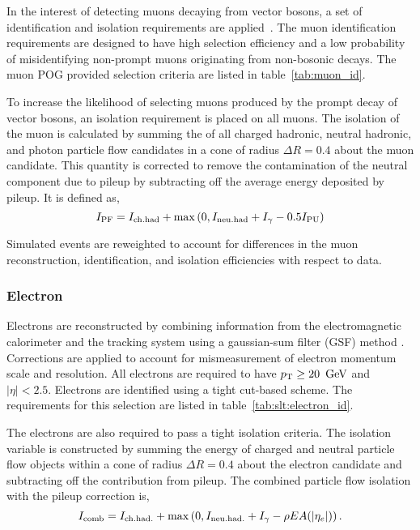 In the interest of detecting muons decaying from vector bosons, a set of identification and isolation requirements are applied~\cite{Sirunyan:2018fpa}. The muon identification requirements are designed to have high selection efficiency and a low probability of misidentifying non-prompt muons originating from non-bosonic decays. The muon POG provided selection criteria are listed in table~\ref{tab:muon_id}.



\noindent To increase the likelihood of selecting muons produced by the prompt decay of vector bosons, an isolation requirement is placed on all muons. The isolation of the muon is calculated by summing the \pt of all charged hadronic, neutral hadronic, and photon particle flow candidates in a cone of radius $\Delta R = 0.4$ about the muon candidate. This quantity is corrected to remove the contamination of the neutral component due to pileup by subtracting off the average energy deposited by pileup. It is defined as,
\begin{equation}
    I_{\rm PF} = I_{\rm ch. had} + \max \left(0, I_{\rm neu. had} +
    I_{\gamma} - 0.5 I_{\rm PU}\right)
\end{equation}

Simulated events are reweighted to account for differences in the muon reconstruction, identification, and isolation efficiencies with respect to data.







\subsubsection{Electron}

Electrons are reconstructed by combining information from the electromagnetic calorimeter and the tracking system using a gaussian-sum
filter (GSF) method \cite{Baffioni:2006cd}.  Corrections are applied to account for mismeasurement of electron momentum scale and resolution. All electrons are required to have $p_{\mathrm{T}} \geq 20~\,\text{Ge\hspace{-.08em}V}$ and $|\eta| < 2.5$.  Electrons are identified using a tight cut-based scheme. The requirements for this selection are listed in table~\ref{tab:slt:electron_id}.



\noindent The electrons are also required to pass a tight isolation criteria. The isolation variable is constructed by summing the energy of charged and neutral particle flow objects within a cone of radius $\Delta R = 0.4$ about the electron candidate and subtracting off the contribution from pileup.  The combined particle flow isolation with the pileup correction is,
\begin{equation}
    \nonumber
    I_{\rm comb} = I_{\rm ch. had.} + \max\left(  0, I_{\rm neu. had.} + I_{\gamma} - \rho EA(|\eta_{e}|) \right).
\end{equation}

